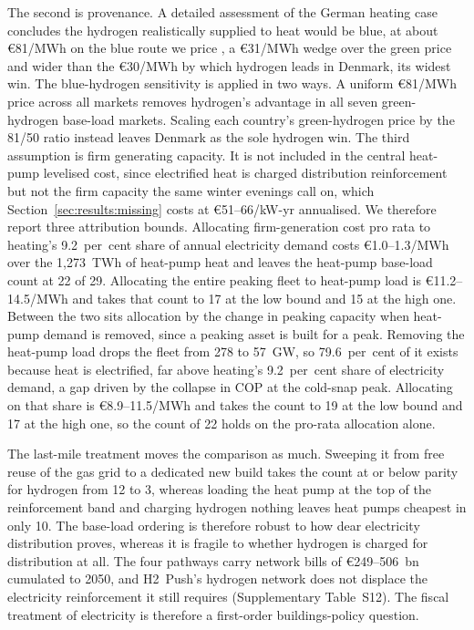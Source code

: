 The second is provenance. A detailed assessment of the German heating case concludes the
hydrogen realistically supplied to heat would be blue, at about \euro{}81/MWh on the blue
route we price \citep{IEAGHG2022blue,Dickel2024ET29}, a \euro{}31/MWh wedge over the green price and wider than the \euro{}30/MWh by which hydrogen leads in Denmark, its widest win. The blue-hydrogen sensitivity is applied in two ways. A uniform \euro{}81/MWh price across all markets removes hydrogen's advantage in all seven green-hydrogen base-load markets. Scaling each country's green-hydrogen price by the 81/50 ratio instead leaves Denmark as the sole hydrogen win. The third assumption is firm generating capacity. It is not included in the central heat-pump levelised cost, since electrified heat is charged distribution reinforcement but not the firm capacity the same winter evenings call on, which Section~\ref{sec:results:missing} costs at \euro{}51--66/kW-yr annualised. We therefore report three attribution bounds. Allocating firm-generation cost pro rata to heating's 9.2~per~cent share of annual electricity demand costs \euro{}1.0--1.3/MWh over the 1{,}273~TWh of heat-pump heat and leaves the heat-pump base-load count at 22 of 29. Allocating the entire peaking fleet to heat-pump load is \euro{}11.2--14.5/MWh and takes that count to 17 at the low bound and 15 at the high one. Between the two sits allocation by the change in peaking capacity when heat-pump demand is removed, since a peaking asset is built for a peak. Removing the heat-pump load drops the fleet from 278 to 57~GW, so 79.6~per~cent of it
exists because heat is electrified, far above heating's 9.2~per~cent share of electricity demand, a gap driven by the collapse in COP at the cold-snap peak. Allocating on that share is \euro{}8.9--11.5/MWh and takes the count to 19 at the low bound and 17 at the high one, so the count of 22 holds on the pro-rata allocation alone.

The last-mile treatment moves the comparison as much. Sweeping it from free reuse of the gas grid to a dedicated new build takes the count at or below parity
for hydrogen from 12 to 3, whereas loading the heat pump at the top of the reinforcement
band and charging hydrogen nothing leaves heat pumps cheapest in only 10. The base-load ordering is therefore robust to how dear electricity distribution proves, whereas it is fragile to whether hydrogen is charged for distribution at all. The four
pathways carry network bills of \euro{}249--506~bn cumulated to 2050, and H2~Push's
hydrogen network does not displace the electricity reinforcement it still requires
(Supplementary Table~S12). The fiscal treatment of electricity is therefore a first-order buildings-policy question.


